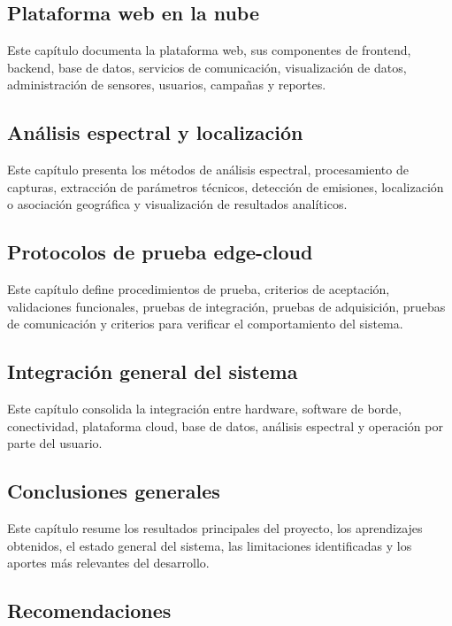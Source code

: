 \subsection{Plataforma web en la nube}

Este capítulo documenta la plataforma web, sus componentes de frontend, backend, base de datos, servicios de comunicación, visualización de datos, administración de sensores, usuarios, campañas y reportes.

\subsection{Análisis espectral y localización}

Este capítulo presenta los métodos de análisis espectral, procesamiento de capturas, extracción de parámetros técnicos, detección de emisiones, localización o asociación geográfica y visualización de resultados analíticos.

\subsection{Protocolos de prueba edge-cloud}

Este capítulo define procedimientos de prueba, criterios de aceptación, validaciones funcionales, pruebas de integración, pruebas de adquisición, pruebas de comunicación y criterios para verificar el comportamiento del sistema.

\subsection{Integración general del sistema}

Este capítulo consolida la integración entre hardware, software de borde, conectividad, plataforma cloud, base de datos, análisis espectral y operación por parte del usuario.

\subsection{Conclusiones generales}

Este capítulo resume los resultados principales del proyecto, los aprendizajes obtenidos, el estado general del sistema, las limitaciones identificadas y los aportes más relevantes del desarrollo.

\subsection{Recomendaciones}

